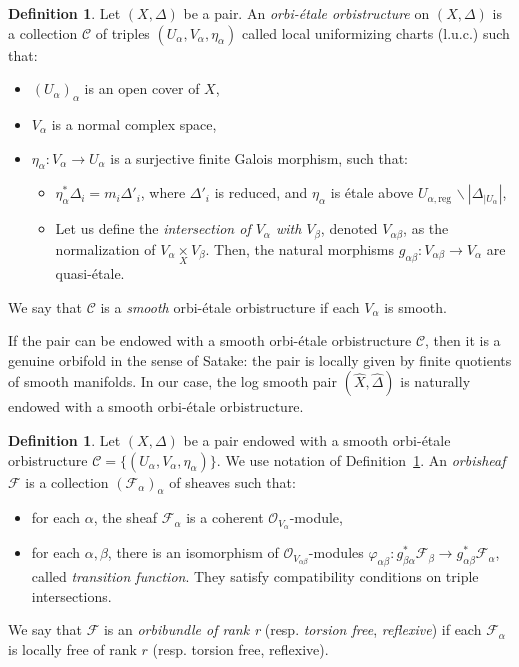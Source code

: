 \documentclass[12pt,a4paper]{amsart}
\newcommand{\reg}{\mathrm{reg}\,}
\theoremstyle{plain}
\theoremstyle{definition}
\newtheorem{defi}[theo]{Definition}
\begin{document}
\begin{defi}\label{Def orbistructure orbi-etale}
    Let $(X, \Delta)$ be a pair. An \emph{orbi-\'etale orbistructure} on $(X, \Delta)$ is a collection $\mathcal{C}$ of triples $(U_\alpha, V_\alpha, \eta_\alpha)$ called local uniformizing charts (l.u.c.) such that:
    \begin{itemize}
        \item $(U_\alpha)_\alpha$ is an open cover of $X$,
        \item $V_\alpha$ is a normal complex space,
        \item $\eta_\alpha : V _\alpha \to U_\alpha$ is a surjective finite Galois morphism, such that:
        \begin{itemize}
            \item $\eta_\alpha^*\Delta_i = m_i \Delta'_i$, where $\Delta'_i$ is reduced, and $\eta_\alpha$ is \'etale above $U_{\alpha, \reg} \backslash |\Delta_{|U_\alpha}|$,
            \item Let us define the \emph{intersection of $V_\alpha$ with $V_\beta$}, denoted $V_{\alpha\beta}$, as the normalization of $V_\alpha \underset{X}{\times} V_\beta$. Then, the natural morphisms $g_{\alpha\beta} : V_{\alpha\beta} \to V_\alpha$ are quasi-\'etale.
        \end{itemize}
    \end{itemize}
    
    We say that $\mathcal{C}$ is a \emph{smooth} orbi-\'etale orbistructure if each $V_\alpha$ is smooth.
\end{defi}

If the pair can be endowed with a smooth orbi-\'etale orbistructure $\mathcal{C}$, then it is a genuine orbifold in the sense of Satake: the pair is locally given by finite quotients of smooth manifolds. In our case, the log smooth pair $(\widehat{X}, \widehat{\Delta})$ is naturally endowed with a smooth orbi-\'etale orbistructure.

\begin{defi}
    Let $(X, \Delta)$ be a pair endowed with a smooth orbi-\'etale orbistructure $\mathcal{C} = \lbrace (U_\alpha, V_\alpha, \eta_\alpha) \rbrace$. We use notation of Definition~\ref{Def orbistructure orbi-etale}. An \emph{orbisheaf} $\mathcal{F}$ is a collection $(\mathcal{F}_\alpha)_\alpha$ of sheaves such that:
    \begin{itemize}
        \item for each $\alpha$, the sheaf $\mathcal{F}_\alpha$ is a coherent $\mathcal{O}_{V_\alpha}$-module,
        \item for each $\alpha, \beta$, there is an isomorphism of $\mathcal{O}_{V_{\alpha\beta}}$-modules $\varphi_{\alpha\beta} : g_{\beta\alpha}^*\mathcal{F}_\beta \to g_{\alpha\beta}^*\mathcal{F}_\alpha$, called \emph{transition function}. They satisfy compatibility conditions on triple intersections. 
    \end{itemize}
We say that $\mathcal{F}$ is an \emph{orbibundle of rank r} (resp. \emph{torsion free}, \emph{reflexive}) if each $\mathcal{F}_\alpha$ is locally free of rank $r$ (resp. torsion free, reflexive). 
\end{defi}
\end{document}
